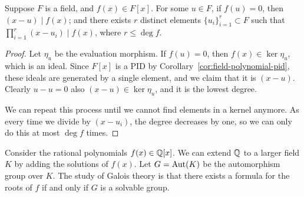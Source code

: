 \begin{theorem}
    Suppose \(F\) is a field, and \(f(x) \in F[x]\).
    For some \(u \in F\), if \(f(u) = 0\), then \((x-u) \mid f(x)\);
    and there exists \(r\) distinct elements \({\{u_i\}}_{i=1}^r \subset F\)
    such that \(\prod_{i=1}^r (x-u_i) \mid f(x)\),
    where \(r \leq \deg f\).
\end{theorem}
\begin{proof}
    Let \(\eta_u\) be the evaluation morphism.
    If \(f(u) = 0\), then \(f(x) \in \ker\eta_u\),
    which is an ideal.
    Since \(F[x]\) is a PID by Corollary~\ref{cor:field-polynomial-pid},
    these ideals are generated by a single element,
    and we claim that it is \((x-u)\).
    Clearly \(u-u = 0\) also \((x-u) \in \ker\eta_u\),
    and it is the lowest degree.

    We can repeat this process until we cannot find elements in a kernel anymore.
    As every time we divide by \((x-u_i)\),
    the degree decreases by one,
    so we can only do this at most \(\deg f\) times.
\end{proof}
\begin{remark}
    Consider the rational polynomials \(f(x) \in \mathbb{Q}[x]\).
    We can extend \(\mathbb{Q}\) to a larger field \(K\)
    by adding the solutions of \(f(x)\).
    Let \(G = \operatorname{Aut}(K)\) be the automorphism group over \(K\).
    The study of Galois theory is that there exists a formula
    for the roots of \(f\) if and only if \(G\) is a solvable group.
\end{remark}

